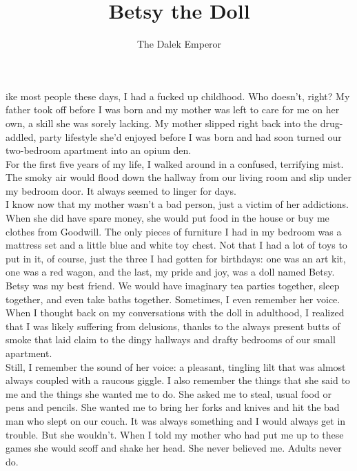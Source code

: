 \documentclass[a5paper]{scrartcl}
\title{Betsy the Doll}
\author{The Dalek Emperor}
\begin{document}
\maketitle

ike most people these days, I had a fucked up childhood. Who doesn't, right? My father took off before I was born and my mother was left to care for me on her own, a skill she was sorely lacking. My mother slipped right back into the drug-addled, party lifestyle she'd enjoyed before I was born and had soon turned our two-bedroom apartment into an opium den. \\

For the first five years of my life, I walked around in a confused, terrifying mist. The smoky air would flood down the hallway from our living room and slip under my bedroom door. It always seemed to linger for days.\\

I know now that my mother wasn't a bad person, just a victim of her addictions. When she did have spare money, she would put food in the house or buy me clothes from Goodwill. The only pieces of furniture I had in my bedroom was a mattress set and a little blue and white toy chest. Not that I had a lot of toys to put in it, of course, just the three I had gotten for birthdays: one was an art kit, one was a red wagon, and the last, my pride and joy, was a doll named Betsy.\\

Betsy was my best friend. We would have imaginary tea parties together, sleep together, and even take baths together. Sometimes, I even remember her voice.\\

When I thought back on my conversations with the doll in adulthood, I realized that I was likely suffering from delusions, thanks to the always present butts of smoke that laid claim to the dingy hallways and drafty bedrooms of our small apartment. \\

Still, I remember the sound of her voice: a pleasant, tingling lilt that was almost always coupled with a raucous giggle. I also remember the things that she said to me and the things she wanted me to do. She asked me to steal, usual food or pens and pencils. She wanted me to bring her forks and knives and hit the bad man who slept on our couch. It was always something and I would always get in trouble. But she wouldn't. When I told my mother who had put me up to these games she would scoff and shake her head. She never believed me. Adults never do.\\
\end{document}
